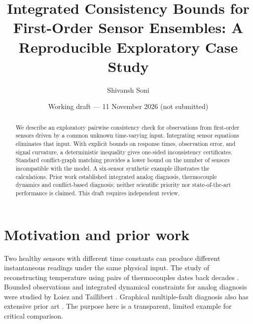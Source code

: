 \documentclass[11pt]{article}
\title{Integrated Consistency Bounds for First-Order Sensor Ensembles: A Reproducible Exploratory Case Study}
\author{Shivansh Soni}
\date{Working draft --- 11 November 2026 (not submitted)}
\begin{document}
\maketitle
\begin{abstract}
We describe an exploratory pairwise consistency check for observations from first-order sensors driven by a common unknown time-varying input. Integrating sensor equations eliminates that input. With explicit bounds on response times, observation error, and signal curvature, a deterministic inequality gives one-sided inconsistency certificates. Standard conflict-graph matching provides a lower bound on the number of sensors incompatible with the model. A six-sensor synthetic example illustrates the calculations. Prior work established integrated analog diagnosis, thermocouple dynamics and conflict-based diagnosis; neither scientific priority nor state-of-the-art performance is claimed. This draft requires independent review.
\end{abstract}
\section{Motivation and prior work}
Two healthy sensors with different time constants can produce different instantaneous readings under the same physical input. The study of reconstructing temperature using pairs of thermocouples dates back decades \cite{tagawa1997}. Bounded observations and integrated dynamical constraints for analog diagnosis were studied by Loiez and Taillibert \cite{loiez1997}. Graphical multiple-fault diagnosis also has extensive prior art \cite{dekleer1987}. The purpose here is a transparent, limited example for critical comparison.
\end{document}
